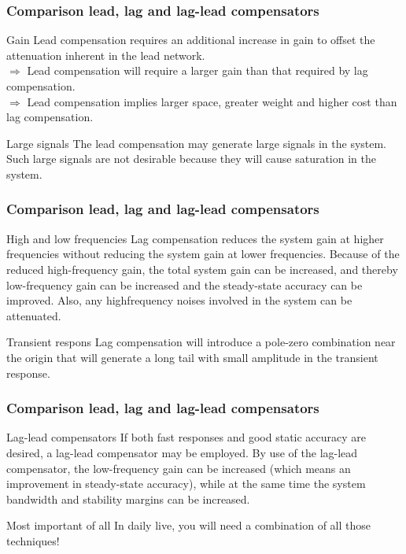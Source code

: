 \begin{frame}
\frametitle{Comparison lead, lag and lag-lead compensators}
\begin{block}{Gain}
Lead compensation requires an additional increase in gain to offset the attenuation
inherent in the lead network. \\
$\Rightarrow$ Lead compensation will require
a larger gain than that required by lag compensation. \\
$\Rightarrow$ Lead compensation implies larger space, greater weight and higher cost than lag compensation.
\end{block}
\begin{block}{Large signals}
The lead compensation may generate large signals in the system. Such large signals
are not desirable because they will cause saturation in the system.
\end{block}
\end{frame}

\begin{frame}
	\frametitle{Comparison lead, lag and lag-lead compensators}
\begin{block}{High and low frequencies}
Lag compensation reduces the system gain at higher frequencies without reducing
the system gain at lower frequencies. Because of the reduced high-frequency
gain, the total system gain can be increased, and thereby low-frequency gain
can be increased and the steady-state accuracy can be improved. Also, any highfrequency
noises involved in the system can be attenuated.
\end{block}
\begin{block}{Transient respons}
Lag compensation will introduce a pole-zero combination near the origin that will
generate a long tail with small amplitude in the transient response.
\end{block}
\end{frame}

\begin{frame}
\frametitle{Comparison lead, lag and lag-lead compensators}
\begin{block}{Lag-lead compensators}
If both fast responses and good static accuracy are desired, a lag-lead compensator
may be employed. By use of the lag-lead compensator, the low-frequency gain can
be increased (which means an improvement in steady-state accuracy), while at the
same time the system bandwidth and stability margins can be increased.
\end{block}
\begin{block}{Most important of all}
In daily live, you will need a combination of all those techniques!
\end{block}
\end{frame}






